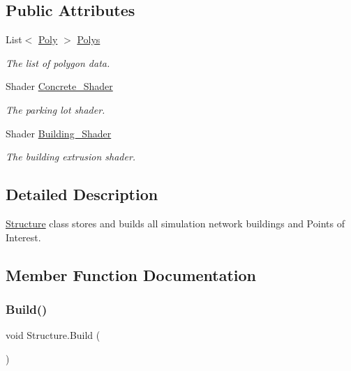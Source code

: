 \subsection*{Public Attributes}
\begin{DoxyCompactItemize}
\item 
List$<$ \mbox{\hyperlink{struct_poly}{Poly}} $>$ \mbox{\hyperlink{class_structure_a45d7defe9341ce74797d6fd86a6ed45f}{Polys}}
\begin{DoxyCompactList}\small\item\em The list of polygon data. \end{DoxyCompactList}\item 
Shader \mbox{\hyperlink{class_structure_a05c38269a337f5964de203d4b698cedd}{Concrete\+\_\+\+Shader}}
\begin{DoxyCompactList}\small\item\em The parking lot shader. \end{DoxyCompactList}\item 
Shader \mbox{\hyperlink{class_structure_aa06a0148d5f248e9a906266898dc79d4}{Building\+\_\+\+Shader}}
\begin{DoxyCompactList}\small\item\em The building extrusion shader. \end{DoxyCompactList}\end{DoxyCompactItemize}


\subsection{Detailed Description}
\mbox{\hyperlink{class_structure}{Structure}} class stores and builds all simulation network buildings and Points of Interest. 



\subsection{Member Function Documentation}
\mbox{\label{class_structure_a8603f9a973205d3dcaf81710fa79158d}} 
\subsubsection{\texorpdfstring{Build()}{Build()}}
{\footnotesize\ttfamily void Structure.\+Build (\begin{DoxyParamCaption}{ }\end{DoxyParamCaption})}



